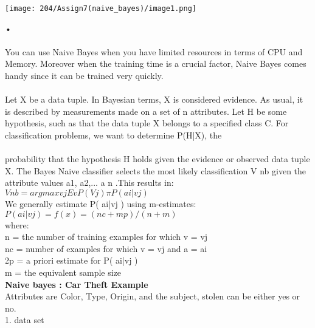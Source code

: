 \documentclass[11pt]{article}
\begin{document}
	\begin{center}
		\texttt{[image: 204/Assign7(naive\_bayes)/image1.png]}
	\end{center}•
	
	\paragraph{}
	You can use Naive Bayes when you have limited resources in terms of CPU and
	Memory. Moreover when the training time is a crucial factor, Naive Bayes comes handy since it
	can be trained very quickly.
	\paragraph{}
	Let X be a data tuple. In Bayesian terms, X is considered evidence. As usual, it is described by
	measurements made on a set of n attributes. Let H be some hypothesis, such as that the data tuple
	X belongs to a specified class C. For classification problems, we want to determine P(H|X), the
	\paragraph{}
	probability that the hypothesis H holds given the evidence or observed data tuple X.
	The Bayes Naive classifier selects the most likely classification V nb given
	the attribute values a1, a2,... a n .This results in: \\
	
	$V nb =argmax vjEv P( V j )πP( ai|vj )$ \\
	
	We generally estimate P( ai|vj ) using m-estimates: \\
	
	$P( ai|vj ) = f (x) = (nc+mp )/(n+m )$ \\
	
	
	where: \\
	n = the number of training examples for which v = vj \\
	nc = number of examples for which v = vj and a = ai \\
	2p = a priori estimate for P( ai|vj ) \\
	m = the equivalent sample size \\
	
	
	\noindent \textbf{Naive bayes : Car Theft Example} \\
	Attributes are Color, Type, Origin, and the subject, stolen can be either
	yes or no. \\
	1. data set
	
\end{document}
